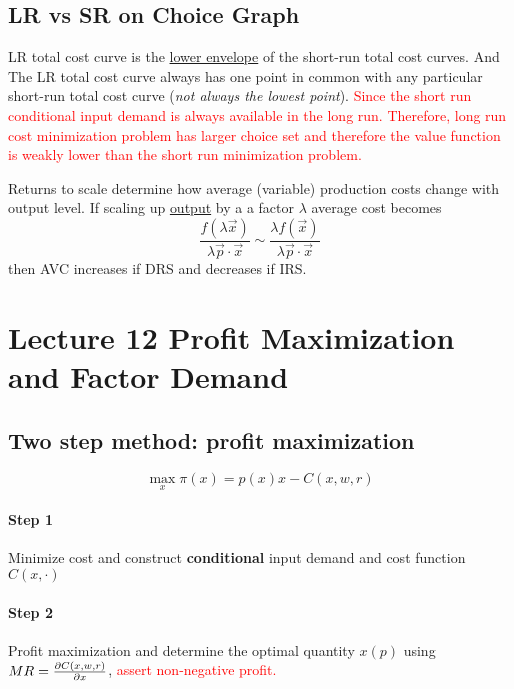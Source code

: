 \documentclass[]{article}
\begin{document}
        \subsection{LR vs SR on Choice Graph}
            \begin{remark}
                LR total cost curve is the \ul{lower envelope} of the short-run total cost curves. And The LR total cost curve always has one point in common with any particular short-run total cost curve (\emph{not always the lowest point}). \textcolor{red}{Since the short run conditional input demand is always available in the long run. Therefore, long run cost minimization problem has larger choice set and therefore the value function is weakly lower than the short run minimization problem.}
            \end{remark}
            
            \begin{remark}
                Returns to scale determine how average (variable) production costs change with output level. If scaling up \ul{output} by a a factor $\lambda$ average cost becomes
                \[
                    \frac{f(\lambda \vec{x})}{\lambda \vec{p} \cdot \vec{x}} \sim \frac{\lambda f(\vec{x})}{\lambda \vec{p} \cdot \vec{x}}
                \]
                then AVC increases if DRS and decreases if IRS.
            \end{remark}
    
    \section{Lecture 12 Profit Maximization and Factor Demand}
        \subsection{Two step method: profit maximization}
            \[
                \max_x \pi(x) = p(x)x - C(x, w, r)
            \]
            \paragraph{Step 1} Minimize cost and construct \textbf{conditional} input demand and cost function $C(x, \cdot)$
            \paragraph{Step 2} Profit maximization and determine the optimal quantity $x(p)$ using $MR = \frac{\partial{C(x, w, r)}}{\partial{x}}$, \textcolor{red}{assert non-negative profit.}
\end{document}
